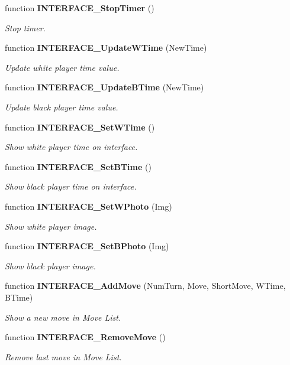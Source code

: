 \begin{CompactItemize}
function {\bf INTERFACE\_\-StopTimer} ()
\begin{CompactList}\small\item\em Stop timer. \item\end{CompactList}\item 
function {\bf INTERFACE\_\-UpdateWTime} (NewTime)
\begin{CompactList}\small\item\em Update white player time value. \item\end{CompactList}\item 
function {\bf INTERFACE\_\-UpdateBTime} (NewTime)
\begin{CompactList}\small\item\em Update black player time value. \item\end{CompactList}\item 
function {\bf INTERFACE\_\-SetWTime} ()
\begin{CompactList}\small\item\em Show white player time on interface. \item\end{CompactList}\item 
function {\bf INTERFACE\_\-SetBTime} ()
\begin{CompactList}\small\item\em Show black player time on interface. \item\end{CompactList}\item 
function {\bf INTERFACE\_\-SetWPhoto} (Img)
\begin{CompactList}\small\item\em Show white player image. \item\end{CompactList}\item 
function {\bf INTERFACE\_\-SetBPhoto} (Img)
\begin{CompactList}\small\item\em Show black player image. \item\end{CompactList}\item 
function {\bf INTERFACE\_\-AddMove} (NumTurn, Move, ShortMove, WTime, BTime)
\begin{CompactList}\small\item\em Show a new move in Move List. \item\end{CompactList}\item 
function {\bf INTERFACE\_\-RemoveMove} ()
\begin{CompactList}\small\item\em Remove last move in Move List. \item\end{CompactList}\end{CompactItemize}



